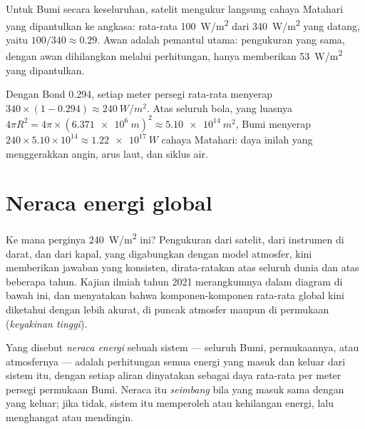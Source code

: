 Untuk Bumi secara keseluruhan, satelit mengukur langsung cahaya Matahari yang
dipantulkan ke angkasa: rata-rata \qty{100}{W/m^2} dari \qty{340}{W/m^2} yang
datang, yaitu  $100/340 \approx 0.29$. Awan adalah pemantul utama:
pengukuran yang sama, dengan awan dihilangkan melalui perhitungan, hanya
memberikan \qty{53}{W/m^2} yang dipantulkan.

\begin{example}\label{ex:g10:earth-energy-budget:absorbed}
Dengan  Bond 0.294, setiap meter persegi rata-rata menyerap $340
\times (1 - 0.294) \approx \qty{240}{W/m^2}$. Atas seluruh bola, yang luasnya
$4\pi R^2 = 4\pi \times (\qty{6.371e6}{m})^2 \approx \qty{5.10e14}{m^2}$, Bumi
menyerap $240 \times 5.10\times10^{14} \approx \qty{1.22e17}{W}$ cahaya
Matahari: daya inilah yang menggerakkan angin, arus laut, dan siklus air.
\end{example}

\section{Neraca energi global}

Ke mana perginya \qty{240}{W/m^2} ini? Pengukuran dari satelit, dari
instrumen di darat, dan dari kapal, yang digabungkan dengan model atmosfer,
kini memberikan jawaban yang konsisten, dirata-ratakan atas seluruh dunia dan
atas beberapa tahun. Kajian ilmiah tahun 2021 merangkumnya dalam diagram di
bawah ini, dan menyatakan bahwa komponen-komponen rata-rata global kini
diketahui dengan lebih akurat, di puncak atmosfer maupun di permukaan
(\emph{keyakinan tinggi}).

\begin{definition}\label{def:g10:earth-energy-budget:energy-budget}
Yang disebut \emph{neraca energi} sebuah sistem ---
seluruh Bumi, permukaannya, atau atmosfernya --- adalah perhitungan semua
energi yang masuk dan keluar dari sistem itu, dengan setiap aliran dinyatakan
sebagai daya rata-rata per meter persegi permukaan Bumi. Neraca itu
\emph{seimbang} bila yang masuk sama dengan yang keluar; jika tidak, sistem
itu memperoleh atau kehilangan energi, lalu menghangat atau mendingin.
\end{definition}

